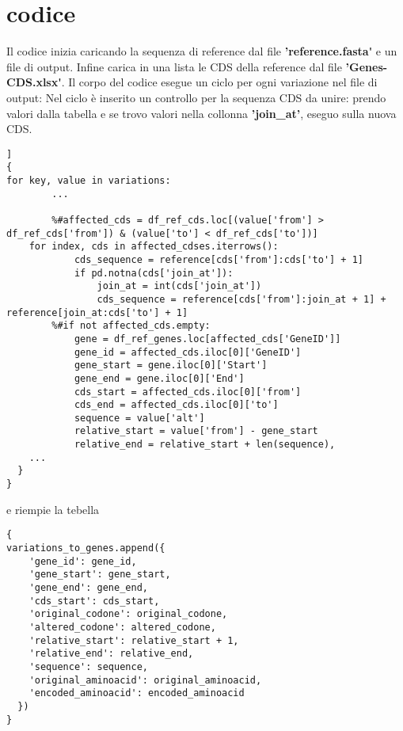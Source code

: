 \documentclass[11pt,italian]{article}
\begin{document}
\section{codice}
	Il codice inizia caricando la sequenza di reference dal file \textbf{'reference.fasta\'} e un file di output.\newline %
	Infine carica in una lista le CDS della reference dal file \textbf{'Genes-CDS.xlsx\'}. \newline
	Il  corpo del codice esegue un ciclo per ogni variazione nel file di output: \newline
	Nel ciclo è inserito un controllo per la sequenza CDS da unire: prendo valori dalla tabella e se trovo valori nella collonna \textbf{'join\_at'}, eseguo sulla nuova CDS. 
	\begin{lstlisting}[basicstyle=\small\ttfamily,caption=Porzione di ciclo,label=code:variations_to_genes = []]
{
for key, value in variations:
        ...
        
        %#affected_cds = df_ref_cds.loc[(value['from'] > df_ref_cds['from']) & (value['to'] < df_ref_cds['to'])]
	for index, cds in affected_cdses.iterrows():
            cds_sequence = reference[cds['from']:cds['to'] + 1]
            if pd.notna(cds['join_at']):
                join_at = int(cds['join_at'])
                cds_sequence = reference[cds['from']:join_at + 1] + reference[join_at:cds['to'] + 1]
        %#if not affected_cds.empty:
            gene = df_ref_genes.loc[affected_cds['GeneID']]
            gene_id = affected_cds.iloc[0]['GeneID']
            gene_start = gene.iloc[0]['Start']
            gene_end = gene.iloc[0]['End']
            cds_start = affected_cds.iloc[0]['from']
            cds_end = affected_cds.iloc[0]['to']
            sequence = value['alt']
            relative_start = value['from'] - gene_start
            relative_end = relative_start + len(sequence),
    ...
  }
}
\end{lstlisting}
	e riempie la tebella
\begin{lstlisting}[basicstyle=\small\ttfamily,caption=Appending nel file di output,label=code:variations_to_genes]
{
variations_to_genes.append({
	'gene_id': gene_id,
	'gene_start': gene_start,
	'gene_end': gene_end,
	'cds_start': cds_start,
	'original_codone': original_codone,
	'altered_codone': altered_codone,
	'relative_start': relative_start + 1,
	'relative_end': relative_end,
	'sequence': sequence,
	'original_aminoacid': original_aminoacid,
	'encoded_aminoacid': encoded_aminoacid
  })
}
\end{lstlisting}	
\end{document}
